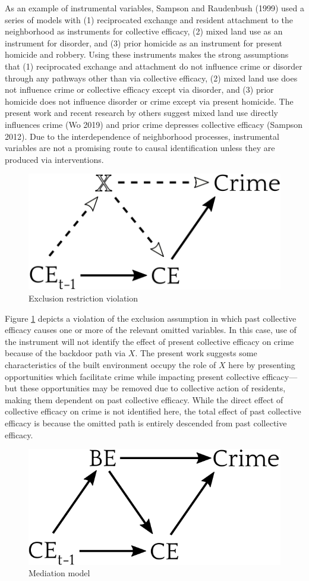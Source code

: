 \documentclass [11pt, proquest] {uwthesis}[2015/03/03]
\begin{document}
As an example of instrumental variables, Sampson and Raudenbush (1999) used a series of models with (1) reciprocated exchange and resident attachment to the neighborhood as instruments for collective efficacy, (2) mixed land use as an instrument for disorder, and (3) prior homicide as an instrument for present homicide and robbery. Using these instruments makes the strong assumptions that (1) reciprocated exchange and attachment do not influence crime or disorder through any pathways other than via collective efficacy, (2) mixed land use does not influence crime or collective efficacy except via disorder, and (3) prior homicide does not influence disorder or crime except via present homicide. The present work and recent research by others suggest mixed land use directly influences crime (Wo 2019) and prior crime depresses collective efficacy (Sampson 2012). Due to the interdependence of neighborhood processes, instrumental variables are not a promising route to causal identification unless they are produced via interventions.
\begin{figure}

{\centering \includegraphics[width=0.5\linewidth]{./figure/appendix/4_bad_instrument} 

}

\caption{Exclusion restriction violation}\label{fig:dag4}
\end{figure}
Figure \ref{fig:dag4} depicts a violation of the exclusion assumption in which past collective efficacy causes one or more of the relevant omitted variables. In this case, use of the instrument will not identify the effect of present collective efficacy on crime because of the backdoor path via \(X\). The present work suggests some characteristics of the built environment occupy the role of \(X\) here by presenting opportunities which facilitate crime while impacting present collective efficacy---but these opportunities may be removed due to collective action of residents, making them dependent on past collective efficacy. While the direct effect of collective efficacy on crime is not identified here, the total effect of past collective efficacy is because the omitted path is entirely descended from past collective efficacy.
\begin{figure}

{\centering \includegraphics[width=0.5\linewidth]{./figure/appendix/4-5_be_model} 

}

\caption{Mediation model}\label{fig:dag45}
\end{figure}
\end{document}

